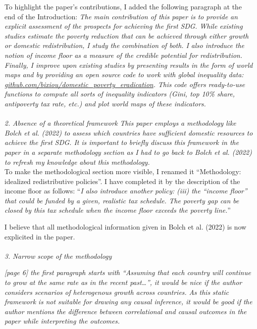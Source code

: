 \documentclass[12pt,english]{article}
\begin{document}
To highlight the paper's contributions, I added the following paragraph at the end of the Introduction: \textit{The main contribution of this paper is to provide an explicit assessment of the prospects for achieving the first SDG. While existing studies estimate the poverty reduction that can be achieved through either growth or domestic redistribution, I study the combination of both. I also introduce the notion of \textit{income floor} as a measure of the credible potential for redistribution. Finally, I improve upon existing studies by presenting results in the form of world maps and by providing an open source code to work with global inequality data: \href{https://github.com/bixiou/domestic_poverty_eradication}{github.com/bixiou/domestic\_poverty\_eradication}. This code offers ready-to-use functions to compute all sorts of inequality indicators (Gini, top 10\% share, antipoverty tax rate, etc.) and plot world maps of these indicators.}
~\\ ~\\

\textit{2.	Absence of a theoretical framework}
\textit{This paper employs a methodology like Bolch et al. (2022) to assess which countries have sufficient domestic resources to achieve the first SDG. It is important to briefly discuss this framework in the paper in a separate methodology section as I had to go back to Bolch et al. (2022) to refresh my knowledge about this methodology. }~\\

To make the methodological section more visible, I renamed it ``Methodology: idealized redistributive policies''. I have completed it by the description of the income floor as follows: ``\textit{I also introduce another policy: (iii) the ``income floor'' that could be funded by a given, realistic tax schedule. The poverty gap can be closed by this tax schedule when the income floor exceeds the poverty line.}'' 

I believe that all methodological information given in Bolch et al. (2022) is now explicited in the paper.
~\\ ~\\

\textit{3.	Narrow scope of the methodology}

\textit{[page 6] the first paragraph starts with “Assuming that each country will continue to grow at the same rate as in the recent past…”, it would be nice if the author considers scenarios of heterogenous growth across countries. As this static framework is not suitable for drawing any causal inference, it would be good if the author mentions the difference between correlational and causal outcomes in the paper while interpreting the outcomes. }~\\
\end{document}
